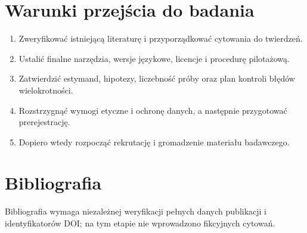 \documentclass[11pt,a4paper]{article}
\begin{document}
\section{Warunki przejścia do badania}
\begin{enumerate}
\item Zweryfikować istniejącą literaturę i przyporządkować cytowania do twierdzeń.
\item Ustalić finalne narzędzia, wersje językowe, licencje i procedurę pilotażową.
\item Zatwierdzić estymand, hipotezy, liczebność próby oraz plan kontroli błędów wielokrotności.
\item Rozstrzygnąć wymogi etyczne i ochronę danych, a następnie przygotować prerejestrację.
\item Dopiero wtedy rozpocząć rekrutację i gromadzenie materiału badawczego.
\end{enumerate}
\section*{Bibliografia}
Bibliografia wymaga niezależnej weryfikacji pełnych danych publikacji i identyfikatorów DOI; na tym etapie nie wprowadzono fikcyjnych cytowań.
\end{document}
